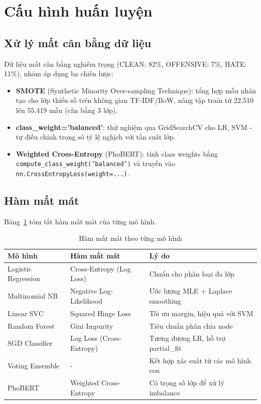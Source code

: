 \section{Cấu hình huấn luyện}

\subsection{Xử lý mất cân bằng dữ liệu}

Dữ liệu mất cân bằng nghiêm trọng (CLEAN: 82\%, OFFENSIVE: 7\%, HATE: 11\%), nhóm áp dụng ba chiến lược:
\begin{itemize}
    \item \textbf{SMOTE} \parencite{chawla2002smote} (Synthetic Minority Over-sampling Technique): tổng hợp mẫu nhân tạo cho lớp thiểu số trên không gian TF-IDF/BoW, nâng tập train từ 22{,}510 lên 55{,}419 mẫu (cân bằng 3 lớp).
    \item \textbf{class\_weight='balanced'}: thử nghiệm qua GridSearchCV cho LR, SVM - tự điều chỉnh trọng số tỷ lệ nghịch với tần suất lớp.
    \item \textbf{Weighted Cross-Entropy} (PhoBERT): tính class weights bằng \texttt{compute\_class\_weight('balanced')} và truyền vào \texttt{nn.CrossEntropyLoss(weight=...)}.
\end{itemize}

\subsection{Hàm mất mát}

Bảng~\ref{tab:loss_functions} tóm tắt hàm mất mát của từng mô hình.

\begin{table}[H]
\centering
\caption{Hàm mất mát theo từng mô hình}
\label{tab:loss_functions}
\begin{tabular}{|l|l|l|}
\hline
\textbf{Mô hình} & \textbf{Hàm mất mát} & \textbf{Lý do} \\
\hline
Logistic Regression & Cross-Entropy (Log Loss) & Chuẩn cho phân loại đa lớp \\
Multinomial NB & Negative Log-Likelihood & Ước lượng MLE + Laplace smoothing \\
Linear SVC & Squared Hinge Loss & Tối ưu margin, hiệu quả với SVM \\
Random Forest & Gini Impurity & Tiêu chuẩn phân chia node \\
SGD Classifier & Log Loss (Cross-Entropy) & Tương đương LR, hỗ trợ partial\_fit \\
Voting Ensemble & - & Kết hợp xác suất từ các mô hình con \\
PhoBERT & Weighted Cross-Entropy & Có trọng số lớp để xử lý imbalance \\
\hline
\end{tabular}
\end{table}

